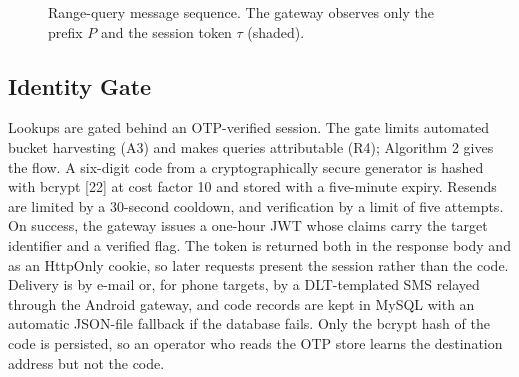 \documentclass[10pt,twocolumn]{article}
\begin{document}
\begin{figure}[!t]
\centering
{}
\caption{Range-query message sequence. The gateway observes only the prefix $P$ and the session token $\tau$ (shaded).}
\label{fig:seq}
\end{figure}

\subsection{Identity Gate}

Lookups are gated behind an OTP-verified session. The gate limits automated bucket harvesting (A3) and makes queries attributable (R4); Algorithm 2 gives the flow. A six-digit code from a cryptographically secure generator is hashed with bcrypt [22] at cost factor 10 and stored with a five-minute expiry. Resends are limited by a 30-second cooldown, and verification by a limit of five attempts. On success, the gateway issues a one-hour JWT whose claims carry the target identifier and a verified flag. The token is returned both in the response body and as an HttpOnly cookie, so later requests present the session rather than the code. Delivery is by e-mail or, for phone targets, by a DLT-templated SMS relayed through the Android gateway, and code records are kept in MySQL with an automatic JSON-file fallback if the database fails. Only the bcrypt hash of the code is persisted, so an operator who reads the OTP store learns the destination address but not the code.
\end{document}
